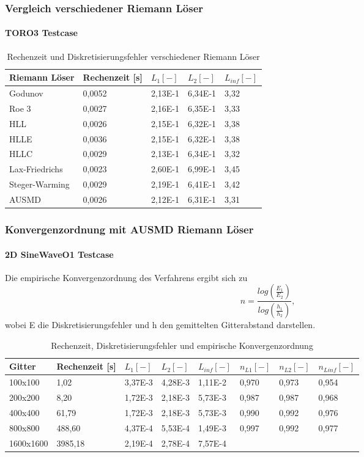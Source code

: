 \documentclass[
	11pt, %
	aspectratio=169, %
]{beamer}
\begin{document}
\begin{frame}
	\frametitle{Vergleich verschiedener Riemann Löser}
	\framesubtitle{TORO3 Testcase} %
	
		\begin{table}
			\begin{tabular}{l l l l l}
				\toprule
				Riemann Löser & Rechenzeit [s] & $L_1 [-]$& $L_2 [-]$& $L_{inf} [-]$\\
				\midrule
				Godunov & 0,0052 & 2,13E-1 & 6,34E-1 & 3,32 \\
				Roe 3 & 0,0027 & 2,16E-1 & 6,35E-1 & 3,33 \\
				HLL & 0,0026 & 2,15E-1 & 6,32E-1 & 3,38 \\
				HLLE & 0,0036 & 2,15E-1 & 6,32E-1 & 3,38 \\
				HLLC & 0,0029 & 2,13E-1 & 6,34E-1 & 3,32 \\
				Lax-Friedrichs & 0,0023 & 2,60E-1 & 6,99E-1 & 3,45 \\
				Steger-Warming & 0,0029 & 2,19E-1 & 6,41E-1 & 3,42 \\
				AUSMD & 0,0026 & 2,12E-1 & 6,31E-1 & 3,31
				\bottomrule
			\end{tabular}
			\caption{Rechenzeit und Diskretisierungsfehler verschiedener Riemann Löser}
		\end{table}
\end{frame}
	
	\begin{frame}
		\frametitle{Konvergenzordnung mit AUSMD Riemann Löser}
		\framesubtitle{2D SineWaveO1 Testcase} %
		
		Die empirische Konvergenzordnung des Verfahrens ergibt sich zu
		$$n=\frac{log(\frac{E_1}{E_2})}{log(\frac{h_1}{h_2})},$$
		wobei E die Diskretisierungsfehler und h den gemittelten Gitterabstand darstellen.
		
		\begin{table}
			\begin{tabular}{l l l l l l l l}
				\toprule
				Gitter& Rechenzeit [s] & $L_1 [-]$ & $L_2 [-]$ & $L_{inf} [-]$ & $n_{L1} [-]$ & $n_{L2} [-]$ & $n_{Linf} [-]$ \\
				\midrule
				100x100 & 1,02 & 3,37E-3 & 4,28E-3 & 1,11E-2 & 0,970 & 0,973 & 0,954\\
				200x200 & 8,20 & 1,72E-3 & 2,18E-3 & 5,73E-3 &0,987 & 0,987 & 0,968 \\
				400x400 & 61,79 & 1,72E-3 & 2,18E-3 & 5,73E-3 & 0,990 & 0,992 & 0,976 \\
				800x800 & 488,60 & 4,37E-4 & 5,53E-4 & 1,49E-3 & 0,997 & 0,992 & 0,977 \\
				1600x1600 & 3985,18 & 2,19E-4 & 2,78E-4 & 7,57E-4 \\
				\bottomrule
			\end{tabular}
			\caption{Rechenzeit, Diskretisierungsfehler und empirische Konvergenzordnung}
		\end{table}
	\end{frame}
	
\end{document}
